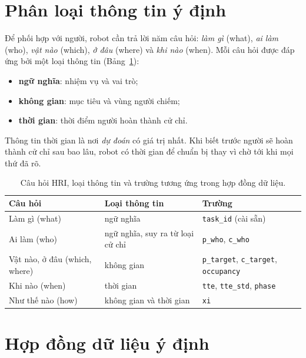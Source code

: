 \section{Phân loại thông tin ý định}
\label{sec:intent-taxonomy}

Để phối hợp với người, robot cần trả lời năm câu hỏi: \emph{làm gì} (what), \emph{ai làm} (who), \emph{vật nào} (which), \emph{ở đâu} (where) và \emph{khi nào} (when). Mỗi câu hỏi được đáp ứng bởi một loại thông tin (Bảng~\ref{tab:taxonomy}):
\begin{itemize}
  \item \textbf{ngữ nghĩa}: nhiệm vụ và vai trò;
  \item \textbf{không gian}: mục tiêu và vùng người chiếm;
  \item \textbf{thời gian}: thời điểm người hoàn thành cử chỉ.
\end{itemize}

Thông tin thời gian là nơi \emph{dự đoán} có giá trị nhất. Khi biết trước người sẽ hoàn thành cử chỉ sau bao lâu, robot có thời gian để chuẩn bị thay vì chờ tới khi mọi thứ đã rõ.

\begin{table}[htbp]
  \centering
  \caption{Câu hỏi HRI, loại thông tin và trường tương ứng trong hợp đồng dữ liệu.}
  \label{tab:taxonomy}
  \begin{tabularx}{\textwidth}{@{}l l X@{}}
    \toprule
    \textbf{Câu hỏi} & \textbf{Loại thông tin} & \textbf{Trường} \\
    \midrule
    Làm gì (what) & ngữ nghĩa & \texttt{task\_id} (cài sẵn) \\
    Ai làm (who) & ngữ nghĩa, suy ra từ loại cử chỉ & \texttt{p\_who}, \texttt{c\_who} \\
    Vật nào, ở đâu (which, where) & không gian & \texttt{p\_target}, \texttt{c\_target}, \texttt{occupancy} \\
    Khi nào (when) & thời gian & \texttt{tte}, \texttt{tte\_std}, \texttt{phase} \\
    Như thế nào (how) & không gian và thời gian & \texttt{xi} \\
    \bottomrule
  \end{tabularx}
\end{table}

\section{Hợp đồng dữ liệu ý định}
\label{sec:contract}

